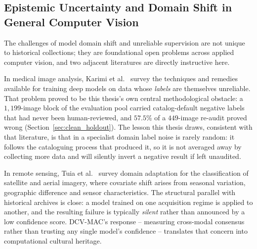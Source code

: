 \documentclass[12pt,a4paper]{report}
\begin{document}
\subsection{Epistemic Uncertainty and Domain Shift in General Computer Vision}
The challenges of model domain shift and unreliable supervision are not unique to historical collections; they are foundational open problems across applied computer vision, and two adjacent literatures are directly instructive here.

In medical image analysis, Karimi et al.~\cite{karimi2020noisy} survey the techniques and remedies available for training deep models on data whose \emph{labels} are themselves unreliable. That problem proved to be this thesis's own central methodological obstacle: a $1{,}199$-image block of the evaluation pool carried catalog-default negative labels that had never been human-reviewed, and $57.5\%$ of a $449$-image re-audit proved wrong (Section~\ref{sec:clean_holdout}). The lesson this thesis draws, consistent with that literature, is that in a specialist domain label noise is rarely random: it follows the cataloguing process that produced it, so it is not averaged away by collecting more data and will silently invert a negative result if left unaudited.

In remote sensing, Tuia et al.~\cite{tuia2016domain} survey domain adaptation for the classification of satellite and aerial imagery, where covariate shift arises from seasonal variation, geographic difference and sensor characteristics. The structural parallel with historical archives is close: a model trained on one acquisition regime is applied to another, and the resulting failure is typically \emph{silent} rather than announced by a low confidence score. DCV-MAC's response -- measuring cross-modal consensus rather than trusting any single model's confidence -- translates that concern into computational cultural heritage.
\end{document}
